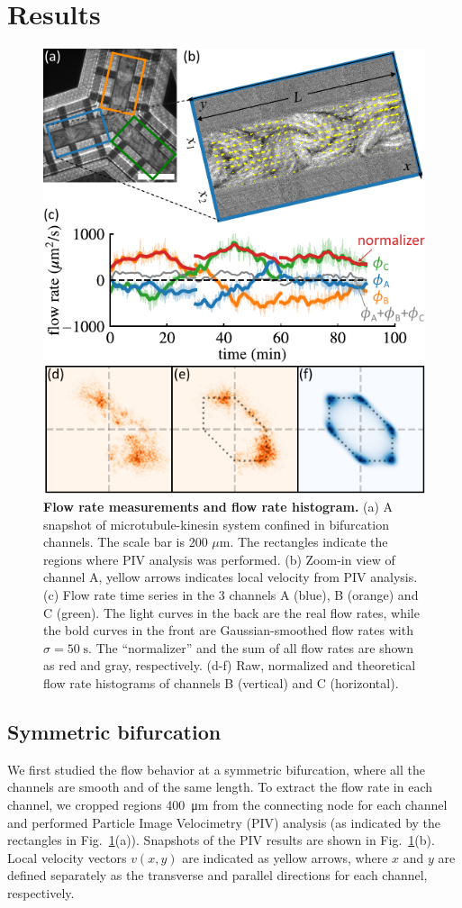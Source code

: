 \documentclass[%
10pt,
superscriptaddress,
twocolumn,
 amsmath,amssymb,
 aps,prx,
]{revtex4-2}
\begin{document}
\section{Results}

\begin{figure}[htb]
    \includegraphics[width=.45\textwidth]{3-bifurcation-symmetric}
    \caption{
    \textbf{Flow rate measurements and flow rate histogram.}
    (a) A snapshot of microtubule-kinesin system confined in bifurcation channels.
    The scale bar is 200 $\mu$m. The rectangles indicate the regions where PIV analysis was performed.
    (b) Zoom-in view of channel A, yellow arrows indicates local velocity from PIV analysis. 
    (c) Flow rate time series in the 3 channels A (blue), B (orange) and C (green). 
    The light curves in the back are the real flow rates, while the bold curves in the front are Gaussian-smoothed flow rates with $\sigma=50\;\mathrm{s}$. The ``normalizer'' and the sum of all flow rates are shown as red and gray, respectively. 
    (d-f) Raw, normalized and theoretical flow rate histograms of channels B (vertical) and C (horizontal). 
    }
    \label{fig:bifurcation-symmetric}
\end{figure}

\subsection{Symmetric bifurcation}

We first studied the flow behavior at a symmetric bifurcation, where all the channels are smooth and of the same length.
To extract the flow rate in each channel, we cropped regions \SI{400}{\micro\meter} from the connecting node for each channel and performed Particle Image Velocimetry (PIV) analysis (as indicated by the rectangles in Fig.~\ref{fig:bifurcation-symmetric}(a)).
Snapshots of the PIV results are shown in Fig.~\ref{fig:bifurcation-symmetric}(b).
Local velocity vectors $v(x,y)$ are indicated as yellow arrows, where $x$ and $y$ are defined separately as the transverse and parallel directions for each channel, respectively.
\end{document}
